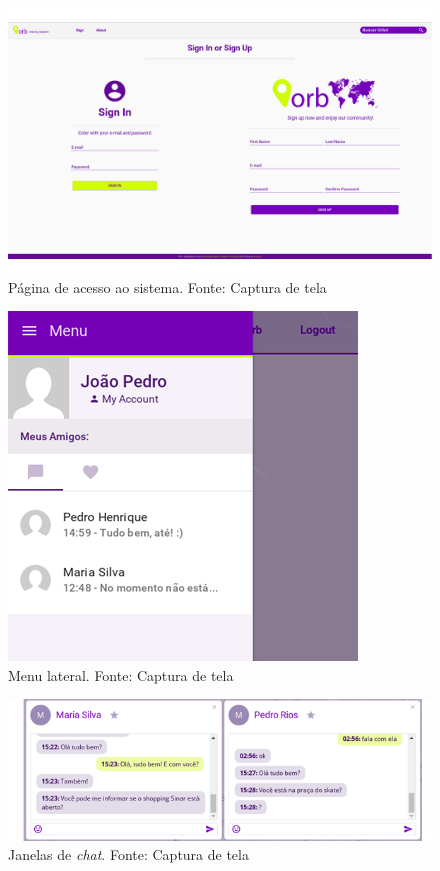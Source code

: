 \begin{figure}[H]
	\centering
	\includegraphics[scale=0.35]{imagens/pagina_signin.png}
	\caption{\small Página de acesso ao sistema. Fonte: Captura de tela}
	\label{fig:pagina-signin}
\end{figure}

\begin{figure}[H]
	\centering
	\includegraphics[scale=1]{imagens/aside_menu.png}
	\caption{\small Menu lateral. Fonte: Captura de tela}
	\label{fig:aside-menu}
\end{figure}

\begin{figure}[H]
	\centering
	\includegraphics[scale=1]{imagens/chat_panel.png}
	\caption{\small Janelas de \textit{chat}. Fonte: Captura de tela}
	\label{fig:chat-panel}
\end{figure}

